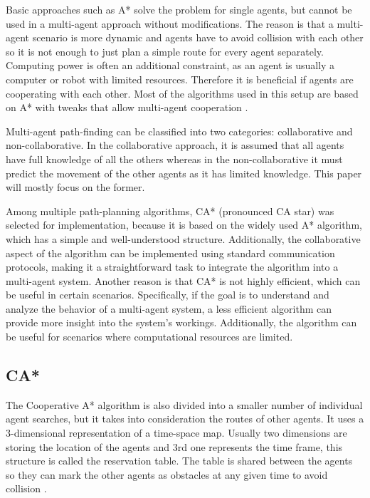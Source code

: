 Basic approaches such as A* solve the problem for single agents, but cannot be used in a multi-agent approach without modifications. The reason is that a multi-agent scenario is more dynamic and agents have to avoid collision with each other so it is not enough to just plan a simple route for every agent separately. Computing power is often an additional constraint, as an agent is usually a computer or robot with limited resources. Therefore it is beneficial if agents are cooperating with each other. Most of the algorithms used in this setup are based on A* with tweaks that allow multi-agent cooperation \cite{path_adv}.

Multi-agent path-finding can be classified into two categories: collaborative and non-collaborative. In the collaborative approach, it is assumed that all agents have full knowledge of all the others whereas in the non-collaborative it must predict the movement of the other agents as it has limited knowledge. This paper will mostly focus on the former. 

Among multiple path-planning algorithms, CA* (pronounced CA star) was selected for implementation, because it is based on the widely used A* algorithm, which has a simple and well-understood structure. Additionally, the collaborative aspect of the algorithm can be implemented using standard communication protocols, making it a straightforward task to integrate the algorithm into a multi-agent system. Another reason is that CA* is not highly efficient, which can be useful in certain scenarios. Specifically, if the goal is to understand and analyze the behavior of a multi-agent system, a less efficient algorithm can provide more insight into the system's workings. Additionally, the algorithm can be useful for scenarios where computational resources are limited.

\subsection{CA*}
The Cooperative A* algorithm is also divided into a smaller number of individual agent searches, but it takes into consideration the routes of other agents. It uses a 3-dimensional representation of a time-space map. Usually two dimensions are storing the location of the agents and 3rd one represents the time frame, this structure is called the reservation table. The table is shared between the agents so they can mark the other agents as obstacles at any given time to avoid collision \cite{path_adv}. 

